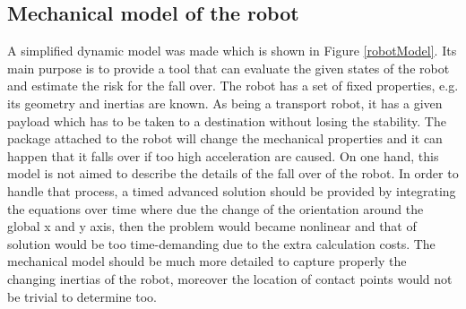 \documentclass[12pt,english,twoside]{article}
\begin{document}
\subsection{Mechanical model of the robot}
A simplified dynamic model was made which is shown in Figure \ref{robotModel}. Its main purpose is to provide a tool that can evaluate the given states of the robot and estimate the risk for the fall over. The robot has a set of fixed properties, e.g. its geometry and inertias are known. As being a transport robot, it has a given payload which has to be taken to a destination without losing the stability. The package attached to the robot will change the mechanical properties and it can happen that it falls over if too high acceleration are caused. On one hand, this model is not aimed to describe the details of the fall over of the robot. In order to handle that process, a timed advanced solution should be provided by integrating the equations over time where due the change of the orientation around the global x and y axis, then the problem would became nonlinear and that of solution would be too time-demanding due to the extra calculation costs. The mechanical model should be much more detailed to capture properly the changing inertias of the robot, moreover the location of contact points would not be trivial to determine too. 
\end{document}
